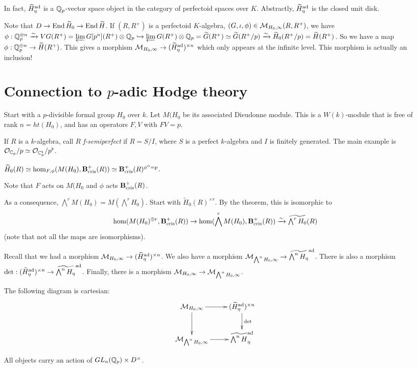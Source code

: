 \documentclass{article}
\begin{document}
In fact, $\widetilde H_\eta^{\textnormal{ad}}$ is a $\mathbb{Q}_p$-vector space object in the category 
of perfectoid spaces over $K$. Abstractly, $\widetilde H_\eta^{\textnormal{ad}}$ is the closed 
unit disk. 

Note that $D\to \operatorname{End} \widetilde H_0 \to \operatorname{End}\widetilde H$. If $(R,R^+)$ is a 
perfectoid $K$-algebra, $(G,\iota,\phi)\in \mathcal{M}_{H_0,\infty}(R,R^+)$, we have 
$\phi:\mathbb{Q}_p^{\oplus n} \xrightarrow\sim V G(R^+) = \varprojlim G[p^n](R^+)\otimes \mathbb{Q}_p \hookrightarrow \varprojlim G(R^+) \otimes \mathbb{Q}_p = \widetilde G(R^+) \simeq \widetilde G(R^+/p)\xrightarrow\sim \widetilde H_0(R^+/p) = \widetilde H(R^+)$. 
So we have a map $\phi:\mathbb{Q}_p^{\oplus n} \to \widetilde H(R^+)$. This gives a 
morphism $\mathcal{M}_{H_0,\infty} \to (\widetilde H_\eta^{\textnormal{ad}})^{\times n}$ which only 
appears at the infinite level. This morphism is actually an inclusion! 






\section{Connection to $p$-adic Hodge theory}

Start with a $p$-divisible formal group $H_0$ over $k$. Let $M(H_0$ be its 
associated Dieudonne module. This is a $W(k)$-module that is free of rank 
$n=ht(H_0)$, and has an operators $F,V$ with $F V=p$. 

If $R$ is a $k$-algebra, call $R$ \emph{f-semiperfect} if 
$R=S/I$, where $S$ is a perfect $k$-algebra and $I$ is finitely generated. The 
main example is $\mathcal{O}_{\mathbb{C}_p} / p \simeq \mathcal{O}_{\mathbb{C}_p^\flat} / p^\flat$. 

\begin{theorem}
$\widetilde H_0(R) \simeq \hom_{F,\phi}(M(H_0),\mathbf{B}_\textnormal{cris}^+(R)) \simeq \mathbf{B}_\textnormal{cris}^+(R)^{\phi^n=p}$. 
\end{theorem}


Note that $F$ acts on $M(H_0$ and $\phi$ acts $\mathbf{B}_\textnormal{cris}^+(R)$. 

As a consequence, $\bigwedge^r M(H_0) = M(\bigwedge^r H_0)$. Start with 
$\widetilde H_0(R)^{\times r}$. By the theorem, this is isomorphic to 
\[
  \hom(M(H_0)^{\oplus r}, \mathbf{B}_\textnormal{cris}^+(R)) \to \hom(\bigwedge^r M(H_0), \mathbf{B}_\textnormal{cris}^+(R)) \xrightarrow\sim \widetilde{\textstyle\bigwedge^r H_0}(R) 
\]
(note that not all the maps are isomorphisms). 

Recall that we had a morphism $\mathcal{M}_{H_0,\infty} \to (\widetilde H_\eta^{\textnormal{ad}})^{\times n}$. 
We also have a morphism $\mathcal{M}_{\bigwedge^n H_0,\infty} \to \widetilde{\bigwedge^n H_\eta}^{\textnormal{ad}}$. There is also a morphism 
$\det:(\widetilde H_\eta^{\textnormal{ad}})^{\times n} \to \widetilde{\bigwedge^n H_\eta}^{\textnormal{ad}}$. 
Finally, there is a morphism $\mathcal{M}_{H_0,\infty} \to \mathcal{M}_{\bigwedge^n H_0,\infty}$. 

\begin{theorem}
The following diagram is cartesian:
\[\xymatrix{
  \cM_{H_0,\infty} \ar[r] \ar[d] 
    & (\widetilde H_\eta^\ad)^{\times n} \ar[d]^-{\det} \\
  \cM_{\bigwedge^n H_0,\infty} \ar[r] 
    & \widetilde{\textstyle\bigwedge^n H}_\eta^\ad 
}\]
\end{theorem}

All objects carry an action of $GL_n(\mathbb{Q}_p)\times D^\times$. 
\end{document}
